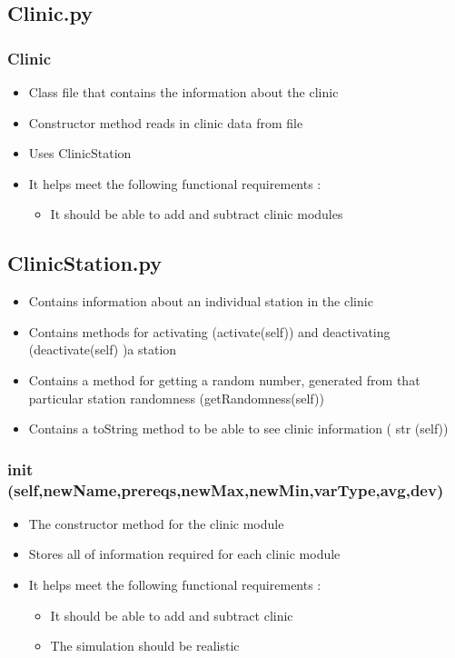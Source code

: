 \documentclass[12pt]{article}
\begin{document}
\subsection{Clinic.py}
\subsubsection{Clinic}
\begin{itemize}  
\item Class file that contains the information about the clinic
\item Constructor method reads in clinic data from file
\item Uses ClinicStation
\item It helps meet the following functional requirements :
\begin{itemize}
	\item It should be able to add and subtract clinic modules
\end{itemize}
\end{itemize}

\subsection{ClinicStation.py}
\begin{itemize}  
\item Contains information about an individual station in the clinic
\item Contains methods for activating (activate(self)) and deactivating (deactivate(self) )a station
\item Contains a method for getting a random number, generated from that particular station randomness (getRandomness(self))
\item Contains a toString method to be able to see clinic information ( str (self))
\end{itemize}
\subsubsection{ init (self,newName,prereqs,newMax,newMin,varType,avg,dev)}
\begin{itemize}
	\item The constructor method for the clinic module
	\item Stores all of information required for each clinic module
	\item It helps meet the following functional requirements :
	\begin{itemize}
		\item It should be able to add and subtract clinic 
		\item The simulation should be realistic
	\end{itemize}
\end{itemize}
\end{document}
